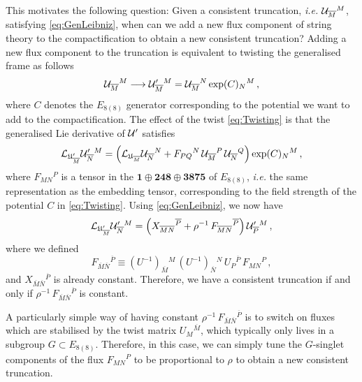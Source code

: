 \documentclass[a4paper, 11pt]{article}
\numberwithin{equation}{section}
\newcommand{\ff}[1]{\mathfrak{#1}}
\newcommand{\ov}[1]{\overline{#1}}
\newcommand{\EE}{\ensuremath{E_{8(8)}}\xspace}
\newcommand{\+}{\oplus}
\newcommand{\gL}{\mathcal{L}}
\newcommand{\cU}{{\cal U}}
\newcommand{\UI}{\left(U^{-1}\right)}
\newcommand{\fl}[1]{\ov{#1}}
\begin{document}
This motivates the following question: Given a consistent truncation, \textit{i.e.} $\cU_{\fl{M}}{}^M$, satisfying \eqref{eq:GenLeibniz}, when can we add a new flux component of string theory to the compactification to obtain a new consistent truncation? Adding a new flux component to the truncation is equivalent to twisting the generalised frame as follows
\begin{equation} \label{eq:Twisting}
	\cU_{\fl{M}}{}^M \longrightarrow \cU'_{\fl{M}}{}^M = \cU_{\fl{M}}{}^N \exp(C)_N{}^M \,,
\end{equation}
where $C$ denotes the $\EE$ generator corresponding to the potential we want to add to the compactification. The effect of the twist \eqref{eq:Twisting} is that the generalised Lie derivative of $\cU'$ satisfies
\begin{equation}
	\gL_{\ff{U}'_{\fl{M}}} \cU'_{\fl{N}}{}^M = \left( \gL_{\ff{U}_{\fl{M}}} \cU_{\fl{N}}{}^N + F_{PQ}{}^N\, \cU_{\fl{M}}{}^P\, \cU_{\fl{N}}{}^Q \right) \exp(C)_N{}^M \,,
\end{equation}
where $F_{MN}{}^P$ is a tensor in the $\mathbf{1} \oplus \mathbf{248} \oplus \mathbf{3875}$ of $\EE$, \textit{i.e.} the same representation as the embedding tensor, corresponding to the field strength of the potential $C$ in \eqref{eq:Twisting}. Using \eqref{eq:GenLeibniz}, we now have
\begin{equation}
	\gL_{\ff{U}'_{\fl{M}}} \cU'_{\fl{N}}{}^M = \left( X_{\fl{M}\fl{N}}{}^{\fl{P}} + \rho^{-1}\, F_{\fl{M}\fl{N}}{}^{\fl{P}} \right) \cU'_{\fl{P}}{}^M \,,
\end{equation}
where we defined
\begin{equation} \label{eq:FlatF}
	F_{\fl{M}\fl{N}}{}^{\fl{P}} \equiv \UI_{\fl{M}}{}^M\, \UI_{\fl{N}}{}^N\, U_P{}^{\fl{P}}\, F_{MN}{}^P \,,
\end{equation}
and $X_{\fl{M}\fl{N}}{}^{\fl{P}}$ is already constant. Therefore, we have a consistent truncation if and only if $\rho^{-1}\, F_{\fl{M}\fl{N}}{}^{\fl{P}}$ is constant.

A particularly simple way of having constant $\rho^{-1}\, F_{\fl{M}\fl{N}}{}^{\fl{P}}$ is to switch on fluxes which are stabilised by the twist matrix $U_M{}^{\fl{M}}$, which typically only lives in a subgroup $G \subset \EE$. Therefore, in this case, we can simply tune the $G$-singlet components of the flux $F_{MN}{}^P$ to be proportional to $\rho$ to obtain a new consistent truncation.
\end{document}
